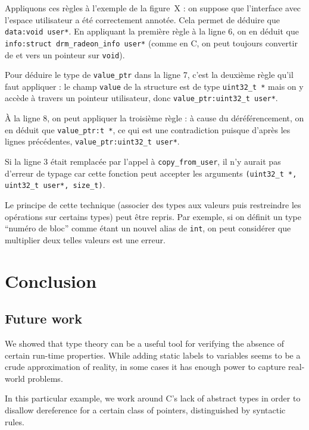 Appliquons ces règles à l'exemple de la figure~X : on suppose que l'interface
avec l'espace utilisateur a été correctement annotée. Cela permet de déduire que
\texttt{data:void user*}. En appliquant la première règle à la ligne 6, on en
déduit que \texttt{info:struct drm\_radeon\_info user*} (comme en C, on peut
toujours convertir de et vers un pointeur sur \texttt{void}).

Pour déduire le type de \texttt{value\_ptr} dans la ligne 7, c'est la
deuxième règle qu'il faut appliquer : le champ \texttt{value} de
la structure est de type \texttt{uint32\_t~*} mais on y accède à travers
un pointeur utilisateur, donc \texttt{value\_ptr:uint32\_t user*}.


À la ligne 8, on peut appliquer la troisième règle : à cause du déréférencement,
on en déduit que \texttt{value\_ptr:t *}, ce qui est une contradiction puisque
d'après les lignes précédentes, \texttt{value\_ptr:uint32\_t user*}.

Si la ligne 3 était remplacée par l'appel à \texttt{copy\_from\_user}, il n'y
aurait pas d'erreur de typage car cette fonction peut accepter les arguments
\texttt{(uint32\_t~*, uint32\_t user*, size\_t)}.

Le principe de cette technique (associer des types aux valeurs puis restreindre
les opérations sur certains types) peut être repris. Par exemple, si on définit
un type ``numéro de bloc'' comme étant un nouvel alias de \texttt{int}, on peut
considérer que multiplier deux telles valeurs est une erreur.%

\section{Conclusion}%

\subsection{Future work}

We showed that type theory can be a useful tool for verifying the absence of
certain run-time properties. While adding static labels to variables seems to be
a crude approximation of reality, in some cases it has enough power to capture
real-world problems.

In this particular example, we work around C's lack of abstract types in order
to disallow dereference for a certain class of pointers, distinguished by
syntactic rules.

